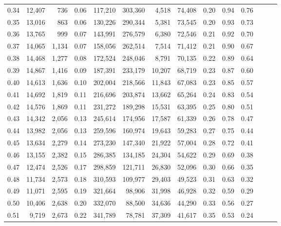 \begin{tabular}{rrrrrrrrrrrrrr}
0.34 &  12,407 &    736 &  0.06 &  117,210 &  303,360 &   4,518 &  74,408 &  0.20 &  0.94 &      0.76 \\
0.35 &  13,016 &    863 &  0.06 &  130,226 &  290,344 &   5,381 &  73,545 &  0.20 &  0.93 &      0.73 \\
0.36 &  13,765 &    999 &  0.07 &  143,991 &  276,579 &   6,380 &  72,546 &  0.21 &  0.92 &      0.70 \\
0.37 &  14,065 &  1,134 &  0.07 &  158,056 &  262,514 &   7,514 &  71,412 &  0.21 &  0.90 &      0.67 \\
0.38 &  14,468 &  1,277 &  0.08 &  172,524 &  248,046 &   8,791 &  70,135 &  0.22 &  0.89 &      0.64 \\
0.39 &  14,867 &  1,416 &  0.09 &  187,391 &  233,179 &  10,207 &  68,719 &  0.23 &  0.87 &      0.60 \\
0.40 &  14,613 &  1,636 &  0.10 &  202,004 &  218,566 &  11,843 &  67,083 &  0.23 &  0.85 &      0.57 \\
0.41 &  14,692 &  1,819 &  0.11 &  216,696 &  203,874 &  13,662 &  65,264 &  0.24 &  0.83 &      0.54 \\
0.42 &  14,576 &  1,869 &  0.11 &  231,272 &  189,298 &  15,531 &  63,395 &  0.25 &  0.80 &      0.51 \\
0.43 &  14,342 &  2,056 &  0.13 &  245,614 &  174,956 &  17,587 &  61,339 &  0.26 &  0.78 &      0.47 \\
0.44 &  13,982 &  2,056 &  0.13 &  259,596 &  160,974 &  19,643 &  59,283 &  0.27 &  0.75 &      0.44 \\
0.45 &  13,634 &  2,279 &  0.14 &  273,230 &  147,340 &  21,922 &  57,004 &  0.28 &  0.72 &      0.41 \\
0.46 &  13,155 &  2,382 &  0.15 &  286,385 &  134,185 &  24,304 &  54,622 &  0.29 &  0.69 &      0.38 \\
0.47 &  12,474 &  2,526 &  0.17 &  298,859 &  121,711 &  26,830 &  52,096 &  0.30 &  0.66 &      0.35 \\
0.48 &  11,734 &  2,573 &  0.18 &  310,593 &  109,977 &  29,403 &  49,523 &  0.31 &  0.63 &      0.32 \\
0.49 &  11,071 &  2,595 &  0.19 &  321,664 &   98,906 &  31,998 &  46,928 &  0.32 &  0.59 &      0.29 \\
0.50 &  10,406 &  2,638 &  0.20 &  332,070 &   88,500 &  34,636 &  44,290 &  0.33 &  0.56 &      0.27 \\
0.51 &   9,719 &  2,673 &  0.22 &  341,789 &   78,781 &  37,309 &  41,617 &  0.35 &  0.53 &      0.24 \\

\end{tabular}
